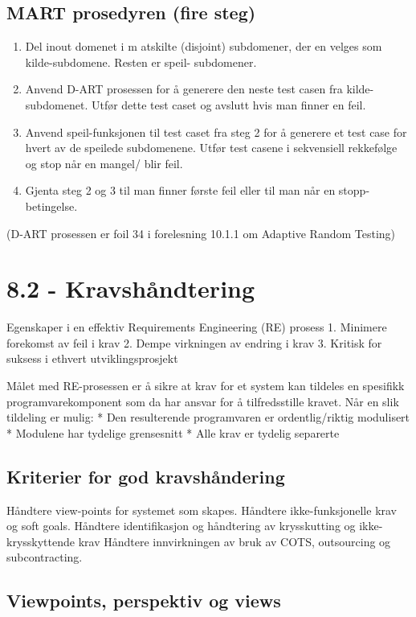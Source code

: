 \subsection{MART prosedyren (fire steg)}

\begin{enumerate}[1.]
\item
  Del inout domenet i m atskilte (disjoint) subdomener, der en velges
  som kilde-subdomene. Resten er speil- subdomener.
\item
  Anvend D-ART prosessen for å generere den neste test casen fra
  kilde-subdomenet. Utfør dette test caset og avslutt hvis man finner en
  feil.
\item
  Anvend speil-funksjonen til test caset fra steg 2 for å generere et
  test case for hvert av de speilede subdomenene. Utfør test casene i
  sekvensiell rekkefølge og stop når en mangel/ blir feil.
\item
  Gjenta steg 2 og 3 til man finner første feil eller til man når en
  stopp-betingelse.
\end{enumerate}
(D-ART prosessen er foil 34 i forelesning 10.1.1 om Adaptive Random
Testing)

\section{8.2 - Kravshåndtering}

Egenskaper i en effektiv Requirements Engineering (RE) prosess 1.
Minimere forekomst av feil i krav 2. Dempe virkningen av endring i krav
3. Kritisk for suksess i ethvert utviklingsprosjekt

Målet med RE-prosessen er å sikre at krav for et system kan tildeles en
spesifikk programvarekomponent som da har ansvar for å tilfredsstille
kravet. Når en slik tildeling er mulig: * Den resulterende programvaren
er ordentlig/riktig modulisert * Modulene har tydelige grensesnitt *
Alle krav er tydelig separerte

\subsection{Kriterier for god kravshåndering}

Håndtere view-points for systemet som skapes. Håndtere ikke-funksjonelle
krav og soft goals. Håndtere identifikasjon og håndtering av
krysskutting og ikke-krysskyttende krav Håndtere innvirkningen av bruk
av COTS, outsourcing og subcontracting.

\subsection{Viewpoints, perspektiv og views}

